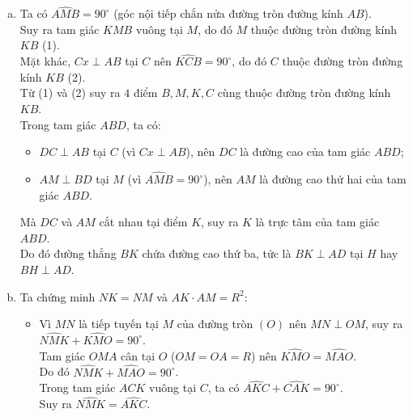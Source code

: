\begin{bt}
{\begin{center}
\end{center}
\begin{enumerate}[a)]
	\item Ta có $\widehat{AMB} = 90^\circ$ (góc nội tiếp chắn nửa đường tròn đường kính $AB$).\\
	Suy ra tam giác $KMB$ vuông tại $M$, do đó $M$ thuộc đường tròn đường kính $KB$ (1).\\
	Mặt khác, $Cx \perp AB$ tại $C$ nên $\widehat{KCB} = 90^\circ$, do đó $C$ thuộc đường tròn đường kính $KB$ (2).\\
	Từ (1) và (2) suy ra $4$ điểm $B, M, K, C$ cùng thuộc đường tròn đường kính $KB$.\\
	Trong tam giác $ABD$, ta có:
	\begin{itemize}
		\item $DC \perp AB$ tại $C$ (vì $Cx \perp AB$), nên $DC$ là đường cao của tam giác $ABD$;
		\item $AM \perp BD$ tại $M$ (vì $\widehat{AMB} = 90^\circ$), nên $AM$ là đường cao thứ hai của tam giác $ABD$.
	\end{itemize}
	Mà $DC$ và $AM$ cắt nhau tại điểm $K$, suy ra $K$ là trực tâm của tam giác $ABD$.\\
	Do đó đường thẳng $BK$ chứa đường cao thứ ba, tức là $BK \perp AD$ tại $H$ hay $BH \perp AD$.
	\item Ta chứng minh $NK = NM$ và $AK \cdot AM = R^2$:
	\begin{itemize}
		\item Vì $MN$ là tiếp tuyến tại $M$ của đường tròn $(O)$ nên $MN \perp OM$, suy ra $\widehat{NMK} + \widehat{KMO} = 90^\circ$.\\
		Tam giác $OMA$ cân tại $O$ ($OM = OA = R$) nên $\widehat{KMO} = \widehat{MAO}$.\\
		Do đó $\widehat{NMK} + \widehat{MAO} = 90^\circ$.\\
		Trong tam giác $ACK$ vuông tại $C$, ta có $\widehat{AKC} + \widehat{CAK} = 90^\circ$.\\
		Suy ra $\widehat{NMK} = \widehat{AKC}$.\\

\end{itemize}
\end{enumerate}}
\end{bt}
